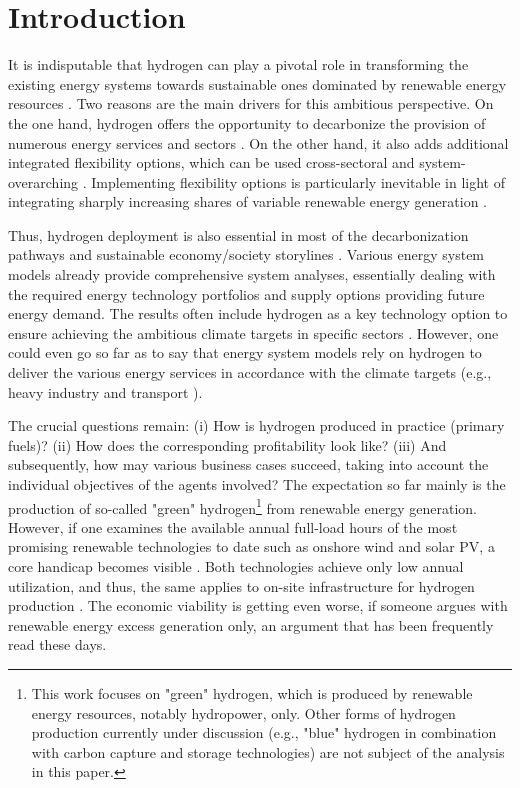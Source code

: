 \documentclass[review]{elsarticle}
\begin{document}
\vspace{0.5cm}
\section{Introduction}
It is indisputable that hydrogen can play a pivotal role in transforming the existing energy systems towards sustainable ones dominated by renewable energy resources \cite{dunn2002hydrogen}. Two reasons are the main drivers for this ambitious perspective. On the one hand, hydrogen offers the opportunity to decarbonize the provision of numerous energy services and sectors \cite{midilli2008hydrogen}. On the other hand, it also adds additional integrated flexibility options, which can be used cross-sectoral and system-overarching \cite{kueppers2021decarbonization}. Implementing flexibility options is particularly inevitable in light of integrating sharply increasing shares of variable renewable energy generation \cite{kroniger2014hydrogen}.\vspace{0.3cm}

Thus, hydrogen deployment is also essential in most of the decarbonization pathways and sustainable economy/society storylines \cite{herbst2021scenario}. Various energy system models already provide comprehensive system analyses, essentially dealing with the required energy technology portfolios and supply options providing future energy demand. The results often include hydrogen as a key technology option to ensure achieving the ambitious climate targets in specific sectors \cite{lux2020supply}. However, one could even go so far as to say that energy system models rely on hydrogen to deliver the various energy services in accordance with the climate targets (e.g., heavy industry \cite{rissman2020technologies} and transport \cite{zhang2016times}).\vspace{0.3cm}

The crucial questions remain: (i) How is hydrogen produced in practice (primary fuels)? (ii) How does the corresponding profitability look like? (iii) And subsequently, how may various business cases succeed, taking into account the individual objectives of the agents involved? The expectation so far mainly is the production of so-called "green" hydrogen\footnote{This work focuses on "green" hydrogen, which is produced by renewable energy resources, notably hydropower, only. Other forms of hydrogen production currently under discussion (e.g., "blue" hydrogen in combination with carbon capture and storage technologies) are not subject of the analysis in this paper.} from renewable energy generation. However, if one examines the available annual full-load hours of the most promising renewable technologies to date such as onshore wind and solar PV, a core handicap becomes visible \cite{ajanovic2018economic}. Both technologies achieve only low annual utilization, and thus, the same applies to on-site infrastructure for hydrogen production \cite{ball2015hydrogen}. The economic viability is getting even worse, if someone argues with renewable energy excess generation only, an argument that has been frequently read these days.\vspace{0.3cm}
\end{document}
